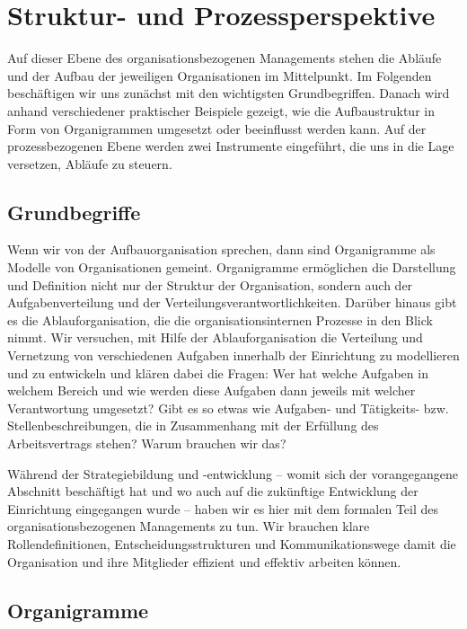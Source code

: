 \documentclass[
  letterpaper,
]{book}
\begin{document}
\chapter{Struktur- und
Prozessperspektive}\label{struktur--und-prozessperspektive}

Auf dieser Ebene des organisationsbezogenen Managements stehen die
Abläufe und der Aufbau der jeweiligen Organisationen im Mittelpunkt. Im
Folgenden beschäftigen wir uns zunächst mit den wichtigsten
Grundbegriffen. Danach wird anhand verschiedener praktischer Beispiele
gezeigt, wie die Aufbaustruktur in Form von Organigrammen umgesetzt oder
beeinflusst werden kann. Auf der prozessbezogenen Ebene werden zwei
Instrumente eingeführt, die uns in die Lage versetzen, Abläufe zu
steuern.

\section{Grundbegriffe}\label{grundbegriffe}

Wenn wir von der Aufbauorganisation sprechen, dann sind Organigramme als
Modelle von Organisationen gemeint. Organigramme ermöglichen die
Darstellung und Definition nicht nur der Struktur der Organisation,
sondern auch der Aufgabenverteilung und der
Verteilungsverantwortlichkeiten. Darüber hinaus gibt es die
Ablauforganisation, die die organisationsinternen Prozesse in den Blick
nimmt. Wir versuchen, mit Hilfe der Ablauforganisation die Verteilung
und Vernetzung von verschiedenen Aufgaben innerhalb der Einrichtung zu
modellieren und zu entwickeln und klären dabei die Fragen: Wer hat
welche Aufgaben in welchem Bereich und wie werden diese Aufgaben dann
jeweils mit welcher Verantwortung umgesetzt? Gibt es so etwas wie
Aufgaben- und Tätigkeits- bzw. Stellenbeschreibungen, die in
Zusammenhang mit der Erfüllung des Arbeitsvertrags stehen? Warum
brauchen wir das?

Während der Strategiebildung und -entwicklung -- womit sich der
vorangegangene Abschnitt beschäftigt hat und wo auch auf die zukünftige
Entwicklung der Einrichtung eingegangen wurde -- haben wir es hier mit
dem formalen Teil des organisationsbezogenen Managements zu tun. Wir
brauchen klare Rollendefinitionen, Entscheidungsstrukturen und
Kommunikationswege damit die Organisation und ihre Mitglieder effizient
und effektiv arbeiten können.

\section{Organigramme}\label{organigramme}
\end{document}
